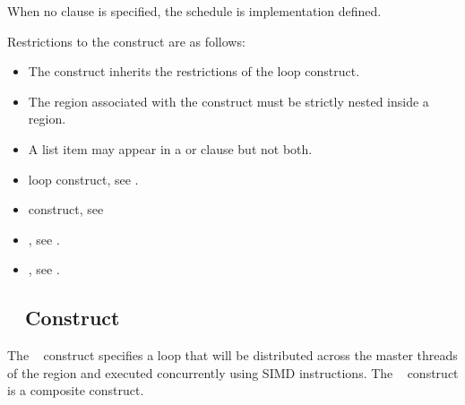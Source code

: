 When no  clause is specified, the schedule is implementation defined.

{} 

\restrictions
Restrictions to the  construct are as follows:

\begin{itemize}
\item The  construct inherits the restrictions of the loop construct.

\item The region associated with the  construct must be
strictly nested inside a  region.

\item A list item may appear in a  or  clause but not both.
\end{itemize}

\crossreferences
\begin{itemize}
\item loop construct, see 
.

\item {} construct, see 

\item {}, see .
\item {}, see
.
\end{itemize}










\subsection{~ Construct}
\label{subsec:distribute simd Construct}
\summary
The ~ construct specifies a loop that will be distributed across the 
master threads of the  region and executed concurrently using SIMD instructions. The ~ construct is a composite construct.

